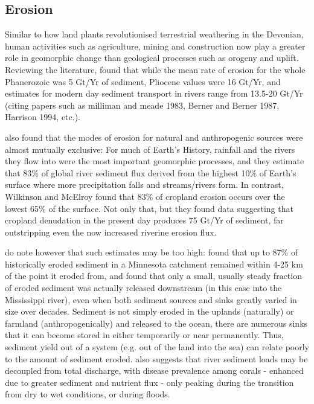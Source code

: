 \documentclass[11pt,a4paper]{article}
\begin{document}
\subsection{Erosion}

Similar to how land plants revolutionised terrestrial weathering in the Devonian,  human activities such as agriculture, mining and construction now play a greater role in geomorphic change than geological processes such as orogeny and uplift. Reviewing the literature, \cite{WilkinsonMcElroy2007} found that while the mean rate of erosion for the whole Phanerozoic was 5 Gt/Yr of sediment, Pliocene values were 16 Gt/Yr, and estimates for modern day sediment transport in rivers  range from 13.5-20 Gt/Yr (citing papers such as milliman and meade 1983, Berner and Berner 1987, Harrison 1994, etc.). 
 
\cite{WilkinsonMcElroy2007} also found that the modes of erosion for natural and anthropogenic sources were almost mutually exclusive: For much of Earth's History, rainfall and the rivers they flow into were the most important geomorphic processes, and they estimate that 83\% of global river sediment flux derived from the highest 10\% of Earth's surface where more precipitation falls and streams/rivers form. In contrast, Wilkinson and McElroy found that 83\% of cropland erosion occurs over the lowest 65\% of the surface. Not only that, but they found data suggesting that cropland denudation in the present day produces 75 Gt/Yr of sediment, far outstripping even the now increased riverine erosion flux.

\cite{WilkinsonMcElroy2007} do note however that such estimates may be too high: \cite{Beach1994} found that up to 87\% of historically eroded sediment in a Minnesota catchment remained within 4-25 km of the point it eroded from, and \cite{Trimble1999} found that only a small, usually steady fraction of eroded sediment was actually released downstream (in this case into the Mississippi river), even when both sediment sources and sinks greatly varied in size over decades. Sediment is not simply eroded in the uplands (naturally) or farmland (anthropogenically) and released to the ocean, there are numerous sinks that it can become stored in either temporarily or near permanently. Thus, sediment yield out of a system (e.g. out of the land into the sea) can relate poorly to the amount of sediment eroded.  \cite{Thompson2014} also suggests that river sediment loads may be decoupled from total discharge, with disease prevalence among corals - enhanced due to greater sediment and nutrient flux - only peaking during the transition from dry to wet conditions, or during floods.
\end{document}

